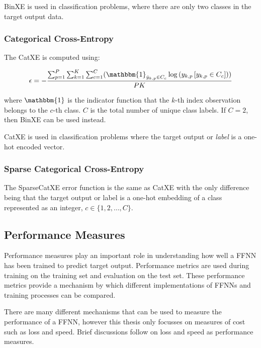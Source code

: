 \noindent \ac{BinXE} is used in classification problems, where there are only
two classes in the target output data.


\subsubsection{Categorical Cross-Entropy}
\label{sec:anns:training:error_functions:cat_xe}

The \ac{CatXE} is computed using:

\begin{equation}
    \epsilon = -\frac{\sum_{p=1}^P \sum_{k=1}^K \sum_{c=1}^C (\mathbbm{1}_{\hat{y}_{k,p} \in C_c} \log{(y_{k,p} \left[ y_{k,p} \in C_c \right])})}{PK}
  \label{eq:cat_xe}
\end{equation}

\noindent where $\mathbbm{1}$ is the indicator function that the $k$-th index observation
belongs to the $c$-th class. $C$ is the total number of unique class labels. If
$C = 2$, then \ac{BinXE} can be used instead.

\ac{CatXE} is used in classification problems where the target
output or \textit{label} is a one-hot encoded vector.


\subsubsection{Sparse Categorical Cross-Entropy}
\label{sec:anns:training:error_functions:sparse_cat_xe}

The \ac{SparseCatXE} error function is the same as \ac{CatXE} with the only
difference being that the target output or label is a one-hot
embedding of a class represented as an integer, $c \in \{1,2, \dots, C\}$.


\subsection{Performance Measures}
\label{sec:anns:training:performance_measures}

Performance measures play an important role in understanding how well a
\ac{FFNN} has been trained to predict target output. Performance metrics are
used during training on the training set and evaluation on the test set. These
performance metrics provide a mechanism by which different implementations of
\acp{FFNN} and training processes can be compared.

There are many different mechanisms that can be used to measure the performance
of a \ac{FFNN}, however this thesis only focusses on measures of cost such as
loss and speed. Brief discussions follow on loss and speed as performance
measures.

